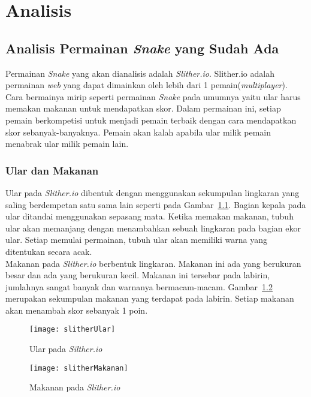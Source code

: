 \chapter{Analisis}
\label{chap:analisis}

\section{Analisis Permainan \textit{Snake} yang Sudah Ada}
Permainan \textit{Snake} yang akan dianalisis adalah \textit{Slither.io}. Slither.io adalah permainan \textit{web} yang dapat dimainkan oleh lebih dari 1 pemain(\textit{multiplayer}). Cara bermainya mirip seperti permainan \textit{Snake} pada umumnya yaitu ular harus memakan makanan untuk mendapatkan skor. Dalam permainan ini, setiap pemain berkompetisi untuk menjadi pemain terbaik dengan cara mendapatkan skor sebanyak-banyaknya. Pemain akan kalah apabila ular milik pemain menabrak ular milik pemain lain. 

\subsection{Ular dan Makanan}
Ular pada \textit{Slither.io} dibentuk dengan menggunakan sekumpulan lingkaran yang saling berdempetan satu sama lain seperti pada Gambar~\ref{fig:slitherUlar}. Bagian kepala pada ular ditandai menggunakan sepasang mata. Ketika memakan makanan, tubuh ular akan memanjang dengan menambahkan sebuah lingkaran pada bagian ekor ular. Setiap memulai permainan, tubuh ular akan memiliki warna yang ditentukan secara acak.\\

Makanan pada \textit{Slither.io} berbentuk lingkaran. Makanan ini ada yang berukuran besar dan ada yang berukuran kecil. Makanan ini tersebar pada labirin, jumlahnya sangat banyak dan warnanya bermacam-macam. Gambar~\ref{fig:slitherMakanan} merupakan sekumpulan makanan yang terdapat pada labirin. Setiap makanan akan menambah skor sebanyak 1 poin.

\begin{figure}[H]
	\centering  
	\texttt{[image: slitherUlar]}  
	\caption[Ular pada \textit{Silther.io}]{Ular pada \textit{Silther.io}}
	\label{fig:slitherUlar} 
\end{figure}

\begin{figure}[H]
	\centering  
	\texttt{[image: slitherMakanan]}  
	\caption[Makanan pada \textit{Slither.io}]{Makanan pada \textit{Slither.io}}
	\label{fig:slitherMakanan} 
\end{figure}

